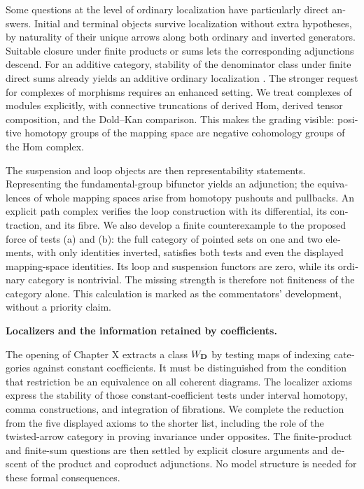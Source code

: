 \begin{otherlanguage}{english}
Some questions at the level of ordinary localization have particularly direct answers. Initial and terminal objects survive localization without extra hypotheses, by naturality of their unique arrows along both ordinary and inverted generators. Suitable closure under finite products or sums lets the corresponding adjunctions descend. For an additive category, stability of the denominator class under finite direct sums already yields an additive ordinary localization \citep[Lemma~2.2.1]{Krause2021}. The stronger request for complexes of morphisms requires an enhanced setting. We treat complexes of modules explicitly, with connective truncations of derived Hom, derived tensor composition, and the Dold--Kan comparison. This makes the grading visible: positive homotopy groups of the mapping space are negative cohomology groups of the Hom complex.

The suspension and loop objects are then representability statements. Representing the fundamental-group bifunctor yields an adjunction; the equivalences of whole mapping spaces arise from homotopy pushouts and pullbacks. An explicit path complex verifies the loop construction with its differential, its contraction, and its fibre. We also develop a finite counterexample to the proposed force of tests (a) and (b): the full category of pointed sets on one and two elements, with only identities inverted, satisfies both tests and even the displayed mapping-space identities. Its loop and suspension functors are zero, while its ordinary category is nontrivial. The missing strength is therefore not finiteness of the category alone. This calculation is marked as the commentators' development, without a priority claim.

\medskip\noindent\textbf{Localizers and the information retained by coefficients.}

The opening of Chapter X extracts a class $W_{\mathbf{D}}$ by testing maps of indexing categories against constant coefficients. It must be distinguished from the condition that restriction be an equivalence on all coherent diagrams. The localizer axioms express the stability of those constant-coefficient tests under interval homotopy, comma constructions, and integration of fibrations. We complete the reduction from the five displayed axioms to the shorter list, including the role of the twisted-arrow category in proving invariance under opposites. The finite-product and finite-sum questions are then settled by explicit closure arguments and descent of the product and coproduct adjunctions. No model structure is needed for these formal consequences.


\end{otherlanguage}
